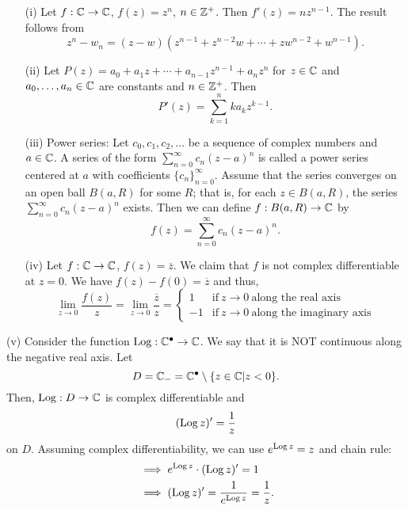 \documentclass[a4paper]{article}
\begin{document}
 \begin{eg}
    \begin{enumerate}
        \item[(i)] Let \( f: \mathbb{C} \to \mathbb{C}  \), \( f(z) = z^{n} \), \( n \in \mathbb{Z}^{+} \). Then \( f'(z) = n z^{n-1} \). The result follows from 
            \[  z^{n} - {w}_{n} = (z-w) (z^{n-1} + z^{n-2} w + \cdots + z w^{n-2} + w^{n-1}). \]
        \item[(ii)] Let \( P(z) = {a}_{0} + {a}_{1} z + \cdots + {a}_{n-1} z^{n-1} + {a}_{n} z^{n} \) for \( z \in \mathbb{C}  \) and \( {a}_{0}, \dots , {a}_{n} \in \mathbb{C}  \) are constants and \( n \in \mathbb{Z}^{+} \). Then
            \[  P'(z) = \sum_{ k=1  }^{ n } k {a}_{k} z^{k-1}.  \]
        \item[(iii)] Power series:
            Let \( {c}_{0}, {c}_{1}, {c}_{2}, \dots  \) be a sequence of complex numbers and \( a \in \mathbb{C}  \). A series of the form \( \sum_{ n=0  }^{ \infty} {c}_{n} (z- a )^{n}   \) is called a power series centered at \( a  \) with coefficients \( \{ {c}_{n} \}_{n=0}^{\infty } \). Assume that the series converges on an open ball \( B(a,R) \) for some \( R  \); that is, for each \( z \in B(a,R) \), the series \( \sum_{ n=0 }^{ \infty  } {c}_{n} (z-a)^{n} \) exists. Then we can define \( f: B(a,R) \to \mathbb{C}  \) by
            \[  f(z) = \sum_{ n=0  }^{ \infty  } {c}_{n} (z-a)^{n}. \]
        \item[(iv)] Let \( f: \mathbb{C} \to \mathbb{C}  \), \( f(z) = \overline{z} \). We claim that \( f \) is not complex differentiable at \( z = 0  \). We have \( f(z) - f(0) = \overline{z} \) and thus,
            \[  \lim_{ z \to 0 }  \frac{ f(z) }{ z    }  =  \lim_{ z \to 0 } \frac{ \overline{z} }{ z } = 
            \begin{cases}
                1 &\text{if} \ z \to 0 \ \text{along the real axis} \\
                -1 &\text{if} \ z \to 0 \  \text{along the imaginary axis}
            \end{cases} \]
    \end{enumerate} 
    \item[(v)] Consider the function \( \operatorname{Log}: \mathbb{C}^{\bullet} \to \mathbb{C}  \). We say that it is NOT continuous along the negative real axis. Let 
        \[  D = {\mathbb{C}}_{-} = \mathbb{C}^{\bullet} \setminus  \{ z \in \mathbb{C} | z < 0 \}. \]
        Then, \( \operatorname{Log}: D \to \mathbb{C}  \) is complex differentiable and 
        \[  (\operatorname{Log} z)' = \frac{ 1 }{ z }   \]
        on \( D  \).
        Assuming complex differentiability, we can use \( e^{\operatorname{Log} z } = z  \) and chain rule:
        \begin{align*}
            &\implies e^{\operatorname{Log} z} \cdot (\operatorname{Log} z)' = 1 \\
            &\implies (\operatorname{Log} z )' = \frac{ 1 }{ e^{\operatorname{Log} z}  }  = \frac{ 1 }{ z }. 
        \end{align*}

 \end{eg}
\end{document}
